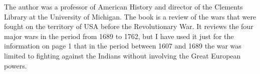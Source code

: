 
The author was a professor of American History and director of the Clements
Library at the University of Michigan. The book is a review of the wars that
were fought on the territory of USA before the Revolutionary War. It reviews
the four major wars in the period from 1689 to 1762, but I have used it just
for the information on page 1 that in the period between 1607 and 1689 the war
was limited to fighting against the Indians without involving the Great
European powers. 

